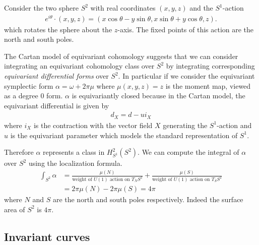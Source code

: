 \begin{example}
	Consider the two sphere $S^2$ with real coordinates $(x,y,z)$ and the $S^1$-action \begin{align*}
		e^{i\theta}\cdot(x,y,z) = (x\cos\theta - y\sin\theta, x\sin\theta + y\cos\theta, z).
	\end{align*}
	which rotates the sphere about the $z$-axis. The fixed points of this action are the north and south poles.

	The Cartan model of equivariant cohomology suggests that we can consider integrating an equivariant cohomology
	class over $S^2$ by integrating corresponding \emph{equivariant differential forms} over $S^2$. In particular
	if we consider the equivariant symplectic form $\alpha = \omega + 2\pi\mu$ where $\mu(x,y,z) = z$
	is the moment map, viewed as a degree $0$ form. $\alpha$ is equivariantly closed because
	in the Cartan model, the equivariant differential is given by \begin{align*}
		d_X = d - ui_X
	\end{align*} where $i_X$ is the contraction with the vector field $X$ generating the $S^1$-action
	and $u$ is the equivariant parameter which models the standard representation of $S^1$.

	Therefore $\alpha$ represents a class in $H^2_{S^1}(S^2)$. We can compute the integral of $\alpha$ over $S^2$
	using the localization formula. \begin{align*}
		\int_{S^2} \alpha & = \frac{\mu(N)}{\text{weight of $U(1)$ action on $T_N S^2$}}
		+ \frac{\mu(S)}{\text{weight of $U(1)$ action on $T_S S^2$}}                     \\
		                  & = 2\pi\mu(N) - 2\pi\mu(S) = 4\pi
	\end{align*} where $N$ and $S$ are the north and south poles respectively. Indeed
	the surface area of $S^2$ is $4\pi$.
\end{example}

\subsection{Invariant curves}


